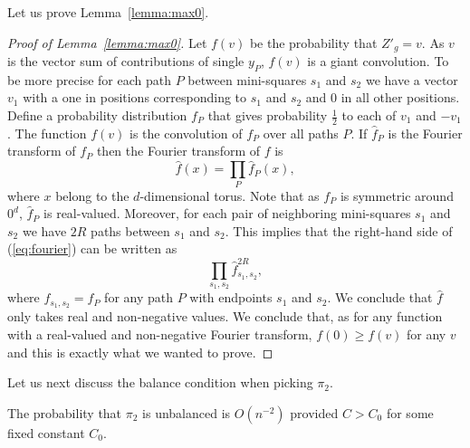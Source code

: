 \documentclass{article}\usepackage[a4paper,margin=20mm]{geometry}
\begin{document}
Let us prove Lemma~\ref{lemma:max0}.
\begin{proof}[Proof of Lemma~\ref{lemma:max0}]
Let $f(v)$ be the probability that $Z'_g=v$.
As $v$ is the vector sum of contributions of single
$y_P$,  $f(v)$ is a giant
convolution.  To be more precise for each path $P$ between
mini-squares $s_1$ and $s_2$ we have a vector $v_1$ with
a one in positions corresponding to $s_1$ and $s_2$ and
0 in all other positions.  Define a probability distribution
$f_P$ that gives probability $\frac 12$ to each of
$v_1$ and $-v_1$.  The function $f(v)$ is
the convolution of $f_P$ over all paths $P$.
If $\hat f_P$ is the Fourier transform of $f_P$ then
the Fourier transform of $f$ is 
\begin{equation}\label{eq:fourier}
\hat f(x)= \prod_P \hat f_P(x),
\end{equation}
where $x$ belong to the $d$-dimensional torus.
Note that as $f_P$ is symmetric around $0^d$, $\hat f_P$ is
real-valued.  Moreover,  for each pair of neighboring
mini-squares $s_1$ and $s_2$ we have $2R$ paths between
$s_1$ and $s_2$.  This implies that the right-hand side
of (\ref{eq:fourier}) can be written as
$$
\prod_{s_1,s_2} \hat f_{s_1,s_2}^{2R},
$$
where $f_{s_1,s_2}=f_P$ for any path $P$ with endpoints
$s_1$ and $s_2$.   We conclude that $\hat f$ only
takes real and non-negative values.  We conclude that,
as for any function with a real-valued and non-negative Fourier transform,
$f(0)\geq f(v)$ for any $v$ and this is exactly what we wanted to 
prove.
\end{proof}

Let us next discuss the balance condition when
picking $\pi_2$.

\begin{lemma}\label{lemma:unbalance}
The probability that $\pi_2$ is unbalanced
is $O(n^{-2})$ provided $C> C_0$ for some
fixed constant $C_0$.
\end{lemma}
\end{document}
